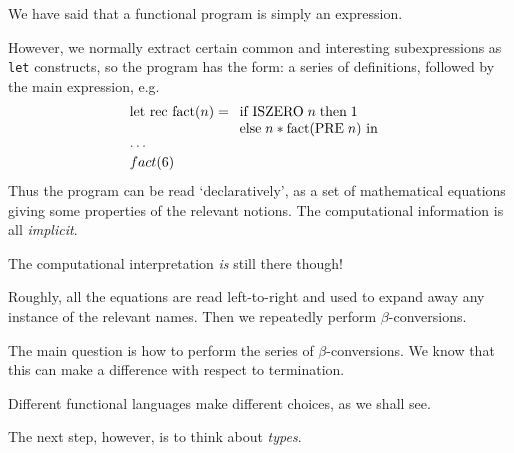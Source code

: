 \begin{slide*}


\vspace*{0.5cm}

We have said that a functional program is simply an expression.

However, we normally extract certain common and interesting subexpressions as
{\red \tt let} constructs, so the program has the form: a series of
definitions, followed by the main expression, e.g.
{\red $$\begin{array}[t]{l} \mbox{let rec fact}(n) = \begin{array}[t]{l} \mbox{if ISZERO}\; n\; \mbox{then}\;1\\
                                \mbox{else}\; n * \mbox{fact}(\mbox{PRE}\; n)
                        \mbox{ in } \end{array} \\
       \cdots\\
       fact(6)
   \end{array}
$$}
Thus the program can be read `declaratively', as a set of mathematical
equations giving some properties of the relevant notions. The computational
information is all {\em implicit}.

\end{slide*}



\begin{slide*}


\vspace*{0.5cm}

The computational interpretation {\em is} still there though!

Roughly, all the equations are read left-to-right and used to expand away any
instance of the relevant names. Then we repeatedly perform $\beta$-conversions.

The main question is how to perform the series of $\beta$-conversions. We know
that this can make a difference with respect to termination.

Different functional languages make different choices, as we shall see.

The next step, however, is to think about {\em types}.

\end{slide*}



